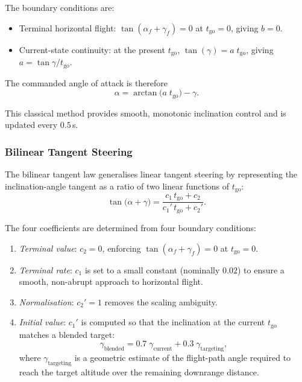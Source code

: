 The boundary conditions are:
\begin{itemize}
  \item Terminal horizontal flight: $\tan(\alpha_f + \gamma_f) = 0$
        at $t_{\text{go}} = 0$, giving $b = 0$.
  \item Current-state continuity: at the present $t_{\text{go}}$,
        $\tan(\gamma) = a\;t_{\text{go}}$, giving
        $a = \tan\gamma / t_{\text{go}}$.
\end{itemize}

The commanded angle of attack is therefore
\begin{equation}
  \alpha = \arctan\!\bigl(a\;t_{\text{go}}\bigr) - \gamma.
  \label{eq:lts_alpha}
\end{equation}

This classical method provides smooth, monotonic inclination control and
is updated every $0.5$\,s.

\subsubsection{Bilinear Tangent Steering}
\label{sssec:bts}

The bilinear tangent law generalises linear tangent steering by representing
the inclination-angle tangent as a ratio of two linear functions of
$t_{\text{go}}$:
\begin{equation}
  \tan\bigl(\alpha + \gamma\bigr)
    = \frac{c_1\,t_{\text{go}} + c_2}
           {c_1'\,t_{\text{go}} + c_2'}.
  \label{eq:bts}
\end{equation}

The four coefficients are determined from four boundary conditions:
\begin{enumerate}
  \item \emph{Terminal value}: $c_2 = 0$,
        enforcing $\tan(\alpha_f + \gamma_f) = 0$ at $t_{\text{go}} = 0$.
  \item \emph{Terminal rate}: $c_1$ is set to a small constant
        (nominally $0.02$) to ensure a smooth, non-abrupt approach to
        horizontal flight.
  \item \emph{Normalisation}: $c_2' = 1$ removes the scaling ambiguity.
  \item \emph{Initial value}: $c_1'$ is computed so that the inclination
        at the current $t_{\text{go}}$ matches a blended target:
        \begin{equation}
          \gamma_{\text{blended}} = 0.7\;\gamma_{\text{current}}
            + 0.3\;\gamma_{\text{targeting}},
          \label{eq:gamma_blend}
        \end{equation}
        where $\gamma_{\text{targeting}}$ is a geometric estimate of the
        flight-path angle required to reach the target altitude over the
        remaining downrange distance.
\end{enumerate}

